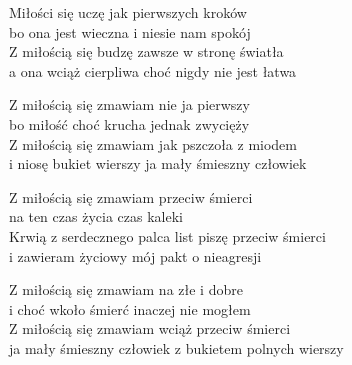 \begin{text}
    Miłości się uczę jak pierwszych kroków\\
    bo ona jest wieczna i niesie nam spokój\\
    Z miłością się budzę zawsze w stronę światła\\
    a ona wciąż cierpliwa choć nigdy nie jest łatwa

    Z miłością się zmawiam nie ja pierwszy\\
    bo miłość choć krucha jednak zwycięży\\
    Z miłością się zmawiam jak pszczoła z miodem\\
    i niosę bukiet wierszy ja mały śmieszny człowiek

    Z miłością się zmawiam przeciw śmierci\\
    na ten czas życia czas kaleki\\
    Krwią z serdecznego palca list piszę przeciw śmierci\\
    i zawieram życiowy mój pakt o nieagresji

    Z miłością się zmawiam na złe i dobre\\
    i choć wkoło śmierć inaczej nie mogłem\\
    Z miłością się zmawiam wciąż przeciw śmierci\\
    ja mały śmieszny człowiek z bukietem polnych wierszy
\end{text}
\begin{chord}

\end{chord}